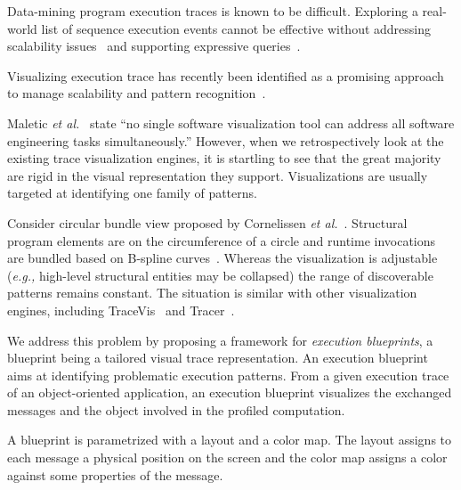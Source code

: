\documentclass[10pt, conference, compsocconf]{IEEEtran}
\newcommand{\eg}{\emph{e.g.,}\xspace}
\newcommand{\etal}{\emph{et al.}\xspace}
\begin{document}

Data-mining program execution traces is known to be difficult. Exploring a real-world list of sequence execution events cannot be effective without addressing scalability issues~\cite{Kuhn06c} and supporting expressive queries~\cite{Zaid05a}. 

Visualizing execution trace has recently been identified as a promising approach to manage scalability and pattern recognition~\cite{Maoz11a,Zaid05a,Reis07a}. %

Maletic \etal~\cite{Male02a} state ``no single software visualization tool can address all software engineering tasks simultaneously.'' However, when we retrospectively look at the existing trace visualization engines, it is startling to see that the great majority are rigid in the visual representation they support. Visualizations are usually targeted at identifying one family of patterns.%

Consider circular bundle view proposed by Cornelissen \etal~\cite{Corn08a}. Structural program elements are on the circumference of a circle and runtime invocations are bundled based on B-spline curves~\cite{Holt06b}. Whereas the visualization is adjustable (\eg high-level structural entities may be collapsed) the range of discoverable patterns remains constant. The situation is similar with other visualization engines, including TraceVis~\cite{Deel07a} and Tracer~\cite{Maoz11a}.

 


We address this problem by proposing a framework for \emph{execution blueprints}, a blueprint being a tailored visual trace representation. An execution blueprint aims at identifying problematic execution patterns. From a given execution trace of an object-oriented application, an execution blueprint visualizes the exchanged messages and the object involved in the profiled computation.

A blueprint is parametrized with a layout and a color map. The layout assigns to each message a physical position on the screen and the color map assigns a color against some properties of the message.
\end{document}
